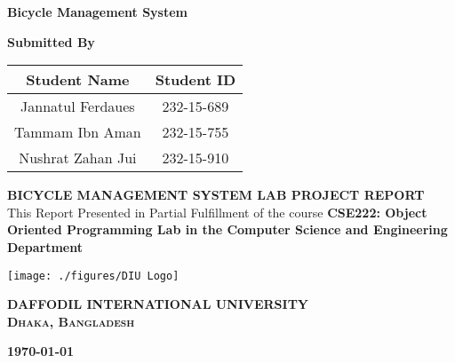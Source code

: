 \begin{titlepage}

\vspace*{2cm} %

\begin{center}
{\huge\bf Bicycle Management System}
\end{center}

\vspace{2cm}

\begin{center}
\Large \bf Submitted By
\end{center}

\vspace{.1cm}

\begin{table}[h!]
\centering
\begin{tabular}{|c|c|}
\hline
\textbf{      Student Name      } & \textbf{  Student ID  } \\
\hline
Jannatul Ferdaues & 232-15-689 \\
\hline
Tammam Ibn Aman & 232-15-755 \\
\hline
Nushrat Zahan Jui & 232-15-910 \\
\hline
\end{tabular}
\end{table}

\vspace{2cm}

\begin{center}
{\Large\bf BICYCLE MANAGEMENT SYSTEM LAB PROJECT REPORT}\\
\vspace{0.2cm}
\Large This Report Presented in Partial Fulfillment of the course  \textbf{CSE222: Object Oriented Programming Lab in the Computer Science and Engineering Department}
\end{center}

\vspace{2cm}

\begin{center}
\texttt{[image: ./figures/DIU Logo]}
\end{center}

\begin{center}
	\Large\textbf{DAFFODIL INTERNATIONAL UNIVERSITY}\\
 \textbf{\textsc{Dhaka, Bangladesh}}
\end{center}

\begin{center}
\textbf{\today}
\end{center}

\end{titlepage}
